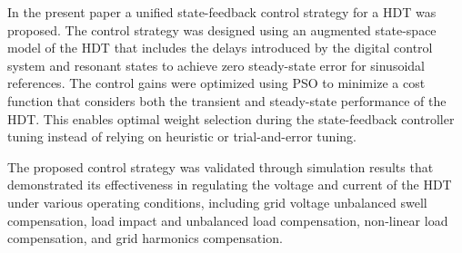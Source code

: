 In the present paper a unified state-feedback control strategy for a HDT was proposed. The control strategy was designed using an augmented state-space model of the HDT that includes the delays introduced by the digital control system and resonant states to achieve zero steady-state error for sinusoidal references. The control gains were optimized using PSO to minimize a cost function that considers both the transient and steady-state performance of the HDT. This enables optimal weight selection during the state-feedback controller tuning instead of relying on heuristic or trial-and-error tuning.

The proposed control strategy was validated through simulation results that demonstrated its effectiveness in regulating the voltage and current of the HDT under various operating conditions, including grid voltage unbalanced swell compensation, load impact and unbalanced load compensation, non-linear load compensation, and grid harmonics compensation.
